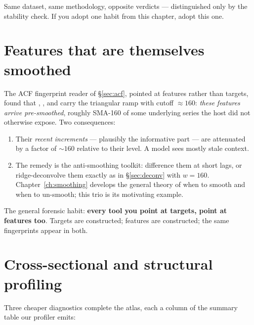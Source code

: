 Same dataset, same methodology, opposite verdicts --- distinguished only by
the stability check. If you adopt one habit from this chapter, adopt this
one.

\section{Features that are themselves smoothed}
\label{sec:featdeconv}

The ACF fingerprint reader of \S\ref{sec:acf}, pointed at features rather
than targets, found that , , and  carry the
triangular ramp with cutoff $\approx 160$: \emph{these features arrive
pre-smoothed}, roughly SMA-160 of some underlying series the host did not
otherwise expose. Two consequences:

\begin{enumerate}
\item Their \emph{recent increments} --- plausibly the informative part ---
  are attenuated by a factor of $\sim 160$ relative to their level. A model
  sees mostly stale context.
\item The remedy is the anti-smoothing toolkit: difference them at short
  lags, or ridge-deconvolve them exactly as in \S\ref{sec:deconv} with
  $w = 160$. Chapter~\ref{ch:smoothing} develops the general theory of when
  to smooth and when to un-smooth; this trio is its motivating example.
\end{enumerate}

The general forensic habit: \textbf{every tool you point at targets, point
at features too}. Targets are constructed; features are constructed; the
same fingerprints appear in both.

\section{Cross-sectional and structural profiling}

Three cheaper diagnostics complete the atlas, each a column of the summary
table our profiler emits:


